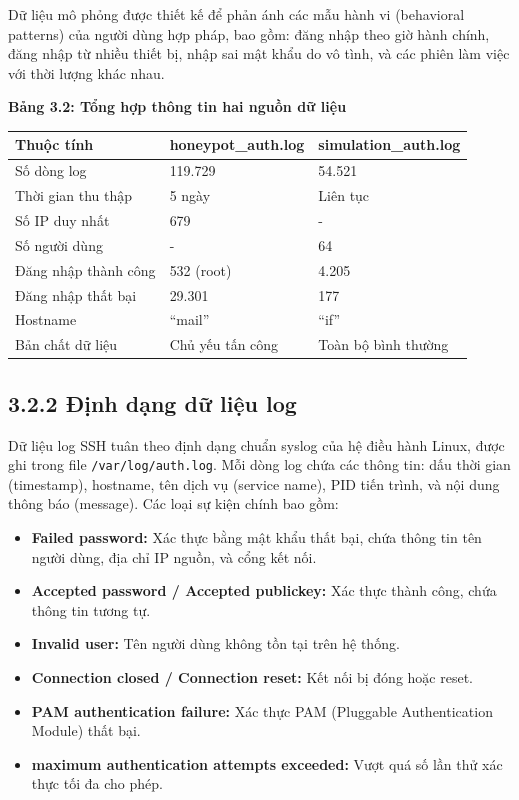 \documentclass[
  a4paper]{report}
\newcounter{none} %
\providecommand{\tightlist}{%
  \setlength{\itemsep}{0pt}\setlength{\parskip}{0pt}}
\begin{document}
Dữ liệu mô phỏng được thiết kế để phản ánh các mẫu hành vi (behavioral
patterns) của người dùng hợp pháp, bao gồm: đăng nhập theo giờ hành
chính, đăng nhập từ nhiều thiết bị, nhập sai mật khẩu do vô tình, và các
phiên làm việc với thời lượng khác nhau.

\textbf{Bảng 3.2: Tổng hợp thông tin hai nguồn dữ liệu}

{\def\LTcaptype{none} %
\begin{longtable}[]{@{}lll@{}}
\toprule\noalign{}
Thuộc tính & honeypot\_auth.log & simulation\_auth.log \\
\midrule\noalign{}
\endhead
\bottomrule\noalign{}
\endlastfoot
Số dòng log & 119.729 & 54.521 \\
Thời gian thu thập & 5 ngày & Liên tục \\
Số IP duy nhất & 679 & - \\
Số người dùng & - & 64 \\
Đăng nhập thành công & 532 (root) & 4.205 \\
Đăng nhập thất bại & 29.301 & 177 \\
Hostname & ``mail'' & ``if'' \\
Bản chất dữ liệu & Chủ yếu tấn công & Toàn bộ bình thường \\
\end{longtable}
}

\subsection{3.2.2 Định dạng dữ liệu
log}\label{ux111ux1ecbnh-dux1ea1ng-dux1eef-liux1ec7u-log}

Dữ liệu log SSH tuân theo định dạng chuẩn syslog của hệ điều hành Linux,
được ghi trong file \texttt{/var/log/auth.log}. Mỗi dòng log chứa các
thông tin: dấu thời gian (timestamp), hostname, tên dịch vụ (service
name), PID tiến trình, và nội dung thông báo (message). Các loại sự kiện
chính bao gồm:

\begin{itemize}
\tightlist
\item
  \textbf{Failed password:} Xác thực bằng mật khẩu thất bại, chứa thông
  tin tên người dùng, địa chỉ IP nguồn, và cổng kết nối.
\item
  \textbf{Accepted password / Accepted publickey:} Xác thực thành công,
  chứa thông tin tương tự.
\item
  \textbf{Invalid user:} Tên người dùng không tồn tại trên hệ thống.
\item
  \textbf{Connection closed / Connection reset:} Kết nối bị đóng hoặc
  reset.
\item
  \textbf{PAM authentication failure:} Xác thực PAM (Pluggable
  Authentication Module) thất bại.
\item
  \textbf{maximum authentication attempts exceeded:} Vượt quá số lần thử
  xác thực tối đa cho phép.
\end{itemize}
\end{document}
